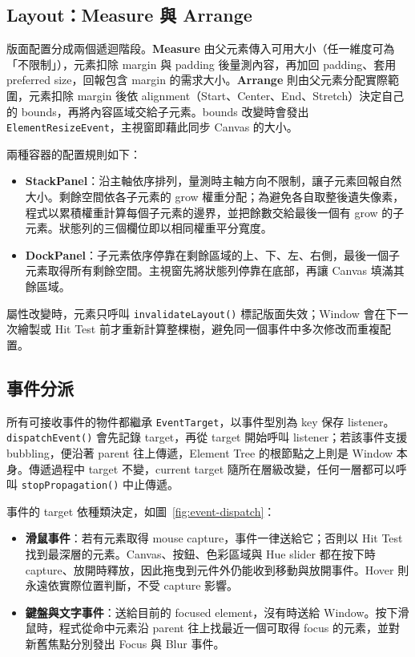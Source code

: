 \subsection{Layout：Measure 與 Arrange}
\label{app:gui-layout}

版面配置分成兩個遞迴階段。\textbf{Measure} 由父元素傳入可用大小（任一維度可為「不限制」），元素扣除 margin 與 padding 後量測內容，再加回 padding、套用 preferred size，回報包含 margin 的需求大小。\textbf{Arrange} 則由父元素分配實際範圍，元素扣除 margin 後依 alignment（Start、Center、End、Stretch）決定自己的 bounds，再將內容區域交給子元素。bounds 改變時會發出 \lstinline|ElementResizeEvent|，主視窗即藉此同步 Canvas 的大小。

兩種容器的配置規則如下：
\begin{itemize}
    \item \textbf{StackPanel}：沿主軸依序排列，量測時主軸方向不限制，讓子元素回報自然大小。剩餘空間依各子元素的 grow 權重分配；為避免各自取整後遺失像素，程式以累積權重計算每個子元素的邊界，並把餘數交給最後一個有 grow 的子元素。狀態列的三個欄位即以相同權重平分寬度。
    \item \textbf{DockPanel}：子元素依序停靠在剩餘區域的上、下、左、右側，最後一個子元素取得所有剩餘空間。主視窗先將狀態列停靠在底部，再讓 Canvas 填滿其餘區域。
\end{itemize}

屬性改變時，元素只呼叫 \lstinline|invalidateLayout()| 標記版面失效；Window 會在下一次繪製或 Hit Test 前才重新計算整棵樹，避免同一個事件中多次修改而重複配置。

\subsection{事件分派}
\label{app:gui-event}

所有可接收事件的物件都繼承 \lstinline|EventTarget|，以事件型別為 key 保存 listener。\lstinline|dispatchEvent()| 會先記錄 target，再從 target 開始呼叫 listener；若該事件支援 bubbling，便沿著 parent 往上傳遞，Element Tree 的根節點之上則是 Window 本身。傳遞過程中 target 不變，current target 隨所在層級改變，任何一層都可以呼叫 \lstinline|stopPropagation()| 中止傳遞。

事件的 target 依種類決定，如圖~\ref{fig:event-dispatch}：
\begin{itemize}
    \item \textbf{滑鼠事件}：若有元素取得 mouse capture，事件一律送給它；否則以 Hit Test 找到最深層的元素。Canvas、按鈕、色彩區域與 Hue slider 都在按下時 capture、放開時釋放，因此拖曳到元件外仍能收到移動與放開事件。Hover 則永遠依實際位置判斷，不受 capture 影響。
    \item \textbf{鍵盤與文字事件}：送給目前的 focused element，沒有時送給 Window。按下滑鼠時，程式從命中元素沿 parent 往上找最近一個可取得 focus 的元素，並對新舊焦點分別發出 Focus 與 Blur 事件。
\end{itemize}

